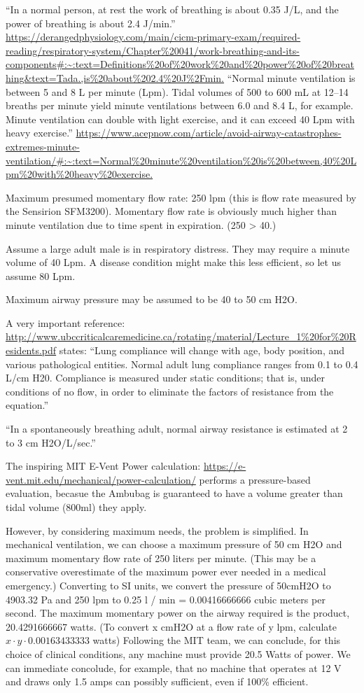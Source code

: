 \documentclass{article}
\begin{document}
``In a normal person, at rest the work of breathing is about 0.35 J/L, and the power of breathing is about 2.4 J/min.''
\url{https://derangedphysiology.com/main/cicm-primary-exam/required-reading/respiratory-system/Chapter%20041/work-breathing-and-its-components#:~:text=Definitions%20of%20work%20and%20power%20of%20breathing&text=Tada.,is%20about%202.4%20J%2Fmin.}
  ``Normal minute ventilation is between 5 and 8 L per minute (Lpm). Tidal volumes of 500 to 600 mL at 12–14 breaths per minute yield minute ventilations between 6.0 and 8.4 L, for example. Minute ventilation can double with light exercise, and it can exceed 40 Lpm with heavy exercise.''
  \url{https://www.acepnow.com/article/avoid-airway-catastrophes-extremes-minute-ventilation/#:~:text=Normal%20minute%20ventilation%20is%20between,40%20Lpm%20with%20heavy%20exercise.}

    Maximum presumed momentary flow rate: 250 lpm (this is flow rate measured by the Sensirion SFM3200). Momentary flow rate is obviously much higher than minute ventilation
    due to time spent in expiration. (250 > 40.)

    Assume a large adult male is in respiratory distress. They may require a minute volume of 40 Lpm. A disease condition might make this less efficient, so let us
    assume 80 Lpm.

    Maximum airway pressure may be assumed to be 40 to 50 cm H2O.

    A very important reference:   \url{http://www.ubccriticalcaremedicine.ca/rotating/material/Lecture_1%20for%20Residents.pdf}
      states:
      ``Lung compliance will change with age, body position, and various pathological
entities. Normal adult lung compliance ranges from 0.1 to 0.4 L/cm H20. Compliance is
measured under static conditions; that is, under conditions of no flow, in order to
eliminate the factors of resistance from the equation.''

``In a spontaneously breathing adult, normal airway resistance is estimated at 2 to 3
cm H2O/L/sec.''

The inspiring MIT E-Vent Power calculation: \url{https://e-vent.mit.edu/mechanical/power-calculation/} performs
a pressure-based evaluation, becasue the Ambubag is guaranteed to have a volume greater than tidal volume (800ml) they apply.

However, by considering maximum needs, the problem is simplified. In mechanical ventilation,
we can choose a maximum pressure of 50 cm H2O and maximum momentary flow rate of 250 liters per minute.
(This may be a conservative overestimate of the maximum power ever needed in a medical emergency.)
Converting to SI units, we convert the pressure of 50cmH2O to 4903.32 Pa and 250 lpm to 0.25 l / min = 0.00416666666 cubic meters per second.
The maximum momentary power on the airway required is the product, 20.4291666667 watts.
(To convert x cmH2O at a flow rate of y lpm, calculate $x \cdot y \cdot 0.00163433333$ watts)
Following the MIT team, we can conclude, for this choice of clinical conditions, any
machine must provide 20.5 Watts of power. We can immediate concolude, for example, that no machine
that operates at 12 V and draws only 1.5 amps can possibly sufficient, even if 100\% efficient.
\end{document}
